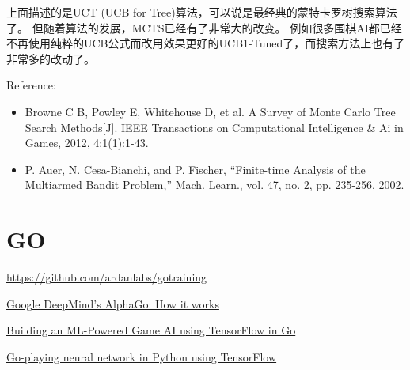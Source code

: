 \documentclass[10pt,a4paper]{ctexbook}
\begin{document}
上面描述的是UCT (UCB for Tree)算法，可以说是最经典的蒙特卡罗树搜索算法了。
但随着算法的发展，MCTS已经有了非常大的改变。
例如很多围棋AI都已经不再使用纯粹的UCB公式而改用效果更好的UCB1-Tuned了，而搜索方法上也有了非常多的改动了。

Reference:
\begin{itemize}
\item Browne C B, Powley E, Whitehouse D, et al. A Survey of Monte Carlo Tree Search Methods[J]. IEEE Transactions on Computational Intelligence \& Ai in Games, 2012, 4:1(1):1-43.
\item P. Auer, N. Cesa-Bianchi, and P. Fischer, “Finite-time Analysis  of the Multiarmed Bandit Problem,” Mach. Learn., vol. 47, no. 2,  pp. 235-256, 2002.
\end{itemize}

\section{GO}

\url{https://github.com/ardanlabs/gotraining}

\href{https://www.tastehit.com/blog/google-deepmind-alphago-how-it-works/}{Google DeepMind's AlphaGo: How it works}

\href{http://gopherdata.io/post/build_ml_powered_game_ai_tensorflow/}{Building an ML-Powered Game AI using TensorFlow in Go}

\href{https://github.com/TheDuck314/go-NN}{Go-playing neural network in Python using TensorFlow}



\ifx\mlbook\undefined
    
\end{document}

